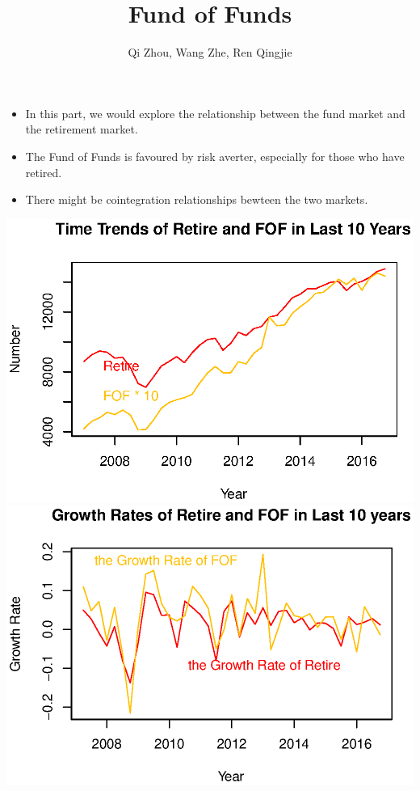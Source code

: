 \documentclass{beamer}
\title[FOF]{Fund of Funds}
\author{Qi Zhou, Wang Zhe, Ren Qingjie}
\institute{School of Physics \& School of Economics, Peking University}
\begin{document}
\maketitle



\begin{frame}
	\begin{itemize}
		\item{In this part, we would explore the relationship between the fund market and the retirement market.}
		\item{The Fund of Funds is favoured by risk averter, especially for those who have retired.}
		\item{There might be cointegration relationships bewteen the two markets.}
	\end{itemize}
	\includegraphics[scale=0.4]{3-0-1.eps}
	\includegraphics[scale=0.4]{3-0-2.eps}
\end{frame}
\end{document}
